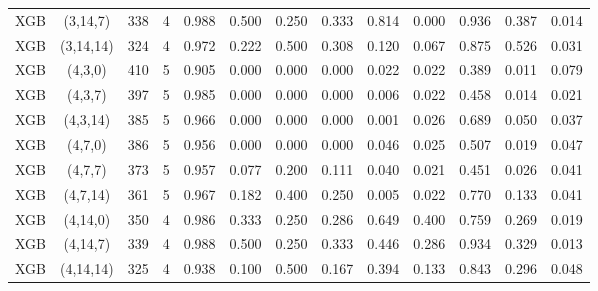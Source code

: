 \begin{longtable}{lcccccccccccc}
XGB & (3,14,7) & 338 & 4 & 0.988 & 0.500 & 0.250 & 0.333 & 0.814 & 0.000 & 0.936 & 0.387 & 0.014 \\
XGB & (3,14,14) & 324 & 4 & 0.972 & 0.222 & 0.500 & 0.308 & 0.120 & 0.067 & 0.875 & 0.526 & 0.031 \\
XGB & (4,3,0) & 410 & 5 & 0.905 & 0.000 & 0.000 & 0.000 & 0.022 & 0.022 & 0.389 & 0.011 & 0.079 \\
XGB & (4,3,7) & 397 & 5 & 0.985 & 0.000 & 0.000 & 0.000 & 0.006 & 0.022 & 0.458 & 0.014 & 0.021 \\
XGB & (4,3,14) & 385 & 5 & 0.966 & 0.000 & 0.000 & 0.000 & 0.001 & 0.026 & 0.689 & 0.050 & 0.037 \\
XGB & (4,7,0) & 386 & 5 & 0.956 & 0.000 & 0.000 & 0.000 & 0.046 & 0.025 & 0.507 & 0.019 & 0.047 \\
XGB & (4,7,7) & 373 & 5 & 0.957 & 0.077 & 0.200 & 0.111 & 0.040 & 0.021 & 0.451 & 0.026 & 0.041 \\
XGB & (4,7,14) & 361 & 5 & 0.967 & 0.182 & 0.400 & 0.250 & 0.005 & 0.022 & 0.770 & 0.133 & 0.041 \\
XGB & (4,14,0) & 350 & 4 & 0.986 & 0.333 & 0.250 & 0.286 & 0.649 & 0.400 & 0.759 & 0.269 & 0.019 \\
XGB & (4,14,7) & 339 & 4 & 0.988 & 0.500 & 0.250 & 0.333 & 0.446 & 0.286 & 0.934 & 0.329 & 0.013 \\
XGB & (4,14,14) & 325 & 4 & 0.938 & 0.100 & 0.500 & 0.167 & 0.394 & 0.133 & 0.843 & 0.296 & 0.048 \\
\end{longtable}
